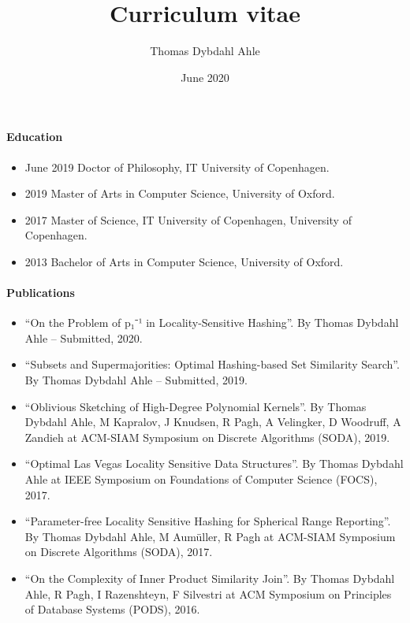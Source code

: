 \documentclass[11pt]{article}
\title{Curriculum vitae}
\author{Thomas Dybdahl Ahle}
\date{June 2020}
\begin{document}
\maketitle


\paragraph{Education}
\begin{itemize}
   \item[]
      June 2019
      Doctor of Philosophy,
      IT University of Copenhagen.
   \item[]
      2019
      Master of Arts in Computer Science,
      University of Oxford.
   \item[]
      2017
      Master of Science,
      IT University of Copenhagen, University of Copenhagen.
   \item[]
      2013
      Bachelor of Arts in Computer Science,
      University of Oxford.
\end{itemize}

\paragraph{Publications}
\begin{itemize}
   \item[]
   ``On the Problem of p₁⁻¹ in Locality-Sensitive Hashing''.
   By
         Thomas Dybdahl Ahle       -- Submitted,
    2020.
   \item[]
   ``Subsets and Supermajorities: Optimal Hashing-based Set Similarity Search''.
   By
         Thomas Dybdahl Ahle       -- Submitted,
    2019.
   \item[]
   ``Oblivious Sketching of High-Degree Polynomial Kernels''.
   By
         Thomas Dybdahl Ahle,       M Kapralov,       J Knudsen,       R Pagh,       A Velingker,       D Woodruff,       A Zandieh       at
       ACM-SIAM Symposium on Discrete Algorithms (SODA),
    2019.
   \item[]
   ``Optimal Las Vegas Locality Sensitive Data Structures''.
   By
         Thomas Dybdahl Ahle       at
       IEEE Symposium on Foundations of Computer Science (FOCS),
    2017.
   \item[]
   ``Parameter-free Locality Sensitive Hashing for Spherical Range Reporting''.
   By
         Thomas Dybdahl Ahle,       M Aumüller,       R Pagh       at
       ACM-SIAM Symposium on Discrete Algorithms (SODA),
    2017.
   \item[]
   ``On the Complexity of Inner Product Similarity Join''.
   By
         Thomas Dybdahl Ahle,       R Pagh,       I Razenshteyn,       F Silvestri       at
       ACM Symposium on Principles of Database Systems (PODS),
    2016.
\end{itemize}
\end{document}
